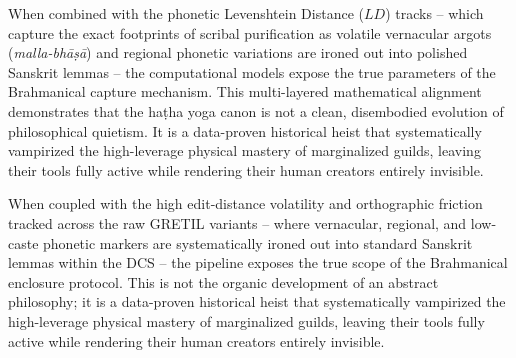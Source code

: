 \documentclass[11pt,twoside,letterpaper]{article}
\begin{document}
When combined with the phonetic Levenshtein Distance ($LD$) tracks -- which capture the exact footprints of scribal purification as volatile vernacular argots (\textit{malla-bhāṣā}) and regional phonetic variations are ironed out into polished Sanskrit lemmas -- the computational models expose the true parameters of the Brahmanical capture mechanism. This multi-layered mathematical alignment demonstrates that the haṭha yoga canon is not a clean, disembodied evolution of philosophical quietism. It is a data-proven historical heist that systematically vampirized the high-leverage physical mastery of marginalized guilds, leaving their tools fully active while rendering their human creators entirely invisible.


When coupled with the high edit-distance volatility and orthographic friction tracked across the raw GRETIL variants -- where vernacular, regional, and low-caste phonetic markers are systematically ironed out into standard Sanskrit lemmas within the DCS -- the pipeline exposes the true scope of the Brahmanical enclosure protocol. This is not the organic development of an abstract philosophy; it is a data-proven historical heist that systematically vampirized the high-leverage physical mastery of marginalized guilds, leaving their tools fully active while rendering their human creators entirely invisible.
\end{document}
